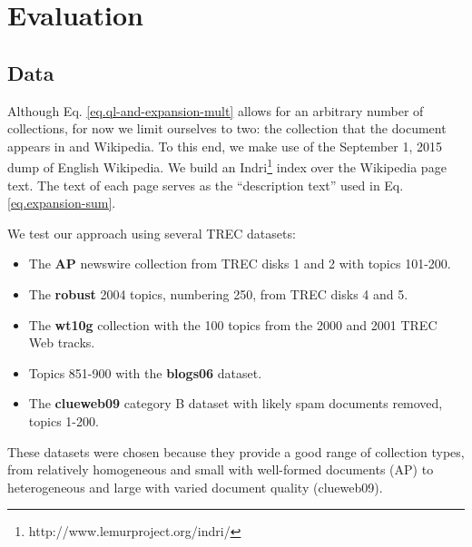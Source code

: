 \documentclass{article}
\begin{document}
\section{Evaluation}\label{section.evaluation}

\subsection{Data}\label{section.evaluation.collections}

Although Eq. \ref{eq.ql-and-expansion-mult} allows for an arbitrary number of collections, for now we limit ourselves to two: the collection that the document appears in and Wikipedia. To this end, we make use of the September 1, 2015 dump of English Wikipedia. We build an Indri\footnote{http://www.lemurproject.org/indri/} index over the Wikipedia page text. The text of each page serves as the ``description text'' used in Eq. \ref{eq.expansion-sum}.

We test our approach using several TREC datasets:
\begin{itemize}
	\item The \textbf{AP} newswire collection from TREC disks 1 and 2 with topics 101-200.
	\item The \textbf{robust} 2004 topics, numbering 250, from TREC disks 4 and 5.
	\item The \textbf{wt10g} collection with the 100 topics from the 2000 and 2001 TREC Web tracks.
	\item Topics 851-900 with the \textbf{blogs06} dataset.
	\item The \textbf{clueweb09} category B dataset with likely spam documents removed, topics 1-200.
\end{itemize}

These datasets were chosen because they provide a good range of collection types, from relatively homogeneous and small with well-formed documents (AP) to heterogeneous and large with varied document quality (clueweb09).

\end{document}
